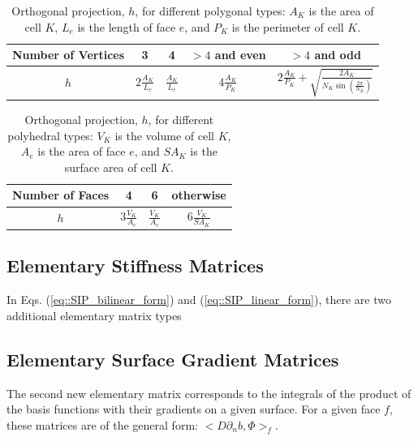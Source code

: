 \begin{table}[h]
\centering
\caption{Orthogonal projection, $h$, for different polygonal types: $A_K$ is the area of cell $K$, $L_e$ is the length of face $e$, and $P_K$ is the perimeter of cell $K$.}
\def\arraystretch{1.4}
\begin{tabular}{|c|c|c|c|c|}
	\hline
	Number of Vertices & 3 & 4 & $>4$ and even& $>4$ and odd \\
	\hline
	$h$ & $2 \frac{A_K}{L_e}$ & $\frac{A_K}{L_e}$ & $4 \frac{A_K}{P_K}$ & $2 \frac{A_K}{P_K} + \sqrt{\frac{2 A_K}{N_K \sin(\frac{2 \pi}{N_K})}}$ \\
	\hline
\end{tabular}
\label{tab::orth_proj_2D}
\end{table}

\begin{table}[h]
\centering
\caption{Orthogonal projection, $h$, for different polyhedral types: $V_K$ is the volume of cell $K$, $A_e$ is the area of face $e$, and $SA_K$ is the surface area of cell $K$.}
\def\arraystretch{1.4}
\begin{tabular}{|c|c|c|c|}
	\hline
	Number of Faces & 4 & 6 & otherwise \\
	\hline
	$h$ & $3 \frac{V_K}{A_e}$ & $\frac{V_K}{A_e}$ & $6 \frac{V_K}{SA_K}$  \\ [1ex]
	\hline
\end{tabular}
\label{tab::orth_proj_3D}
\end{table}

\subsection{Elementary Stiffness Matrices}
\label{sec::DSA_SIP_Stiffness}

In Eqs. (\ref{eq::SIP_bilinear_form}) and (\ref{eq::SIP_linear_form}), there are two additional elementary matrix types 

\subsection{Elementary Surface Gradient Matrices}
\label{sec::DSA_SIP_SurfaceGradient}

The second new elementary matrix corresponds to the integrals of the product of the basis functions with their gradients on a given surface. For a given face $f$, these matrices are of the general form: $\Big<  D \partial_n b, \Phi \Big>_f$.

